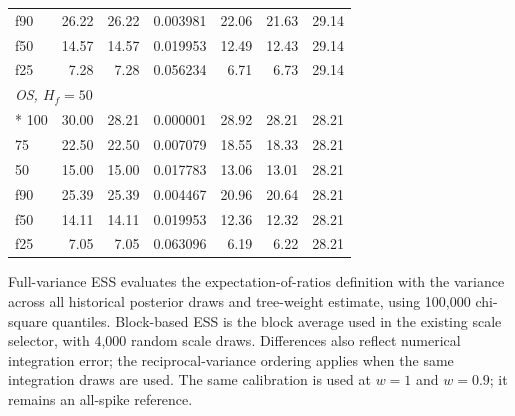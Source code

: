 \begin{landscape}
\begin{longtable}{lrrrrrr}
f90 & 26.22 & 26.22 & 0.003981 & 22.06 & 21.63 & 29.14 \\
f50 & 14.57 & 14.57 & 0.019953 & 12.49 & 12.43 & 29.14 \\
f25 & 7.28 & 7.28 & 0.056234 & 6.71 & 6.73 & 29.14 \\
\multicolumn{7}{l}{\strut\textit{OS, $H_f=50$}}\\*
100 & 30.00 & 28.21 & 0.000001 & 28.92 & 28.21 & 28.21 \\
75 & 22.50 & 22.50 & 0.007079 & 18.55 & 18.33 & 28.21 \\
50 & 15.00 & 15.00 & 0.017783 & 13.06 & 13.01 & 28.21 \\
f90 & 25.39 & 25.39 & 0.004467 & 20.96 & 20.64 & 28.21 \\
f50 & 14.11 & 14.11 & 0.019953 & 12.36 & 12.32 & 28.21 \\
f25 & 7.05 & 7.05 & 0.063096 & 6.19 & 6.22 & 28.21 \\
\end{longtable}
\noindent\begin{minipage}{\linewidth}\footnotesize Full-variance ESS evaluates the expectation-of-ratios definition with the variance across all historical posterior draws and tree-weight estimate, using 100,000 chi-square quantiles. Block-based ESS is the block average used in the existing scale selector, with 4,000 random scale draws. Differences also reflect numerical integration error; the reciprocal-variance ordering applies when the same integration draws are used. The same calibration is used at $w=1$ and $w=0.9$; it remains an all-spike reference.\end{minipage}
\endgroup
\end{landscape}
